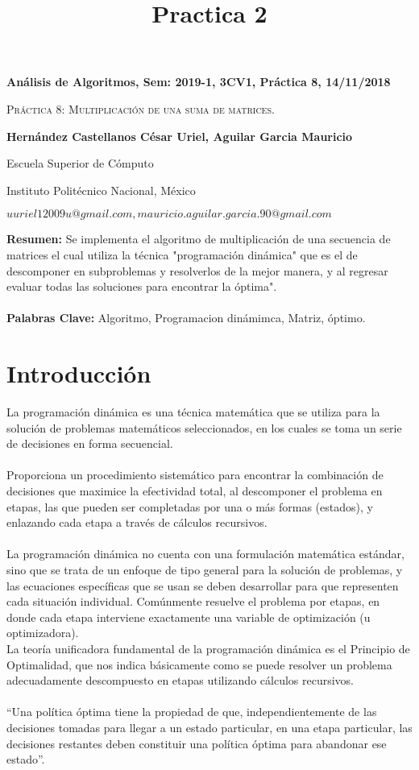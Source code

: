 \documentclass[12pt,twoside]{article}
\title{Practica 2}
\date{}
\begin{document}
\centerline{\bf An\'alisis de Algoritmos, Sem: 2019-1, 3CV1, Pr\'actica 8, 14/11/2018}
\centerline{}
\centerline{}
\begin{center}
\Large{\textsc{Pr\'actica 8:  Multiplicación de una suma de matrices.}}
\end{center}
\centerline{}
\centerline{\bf {Hern\'andez Castellanos C\'esar Uriel, Aguilar Garcia Mauricio}}
\centerline{}
\centerline{Escuela Superior de C\'omputo}
\centerline{Instituto Polit\'ecnico Nacional, M\'exico}
\centerline{$uuriel12009u@gmail.com, mauricio.aguilar.garcia.90@gmail.com$}
\newtheorem{Theorem}{\quad Theorem}[section]
\newtheorem{Definition}[Theorem]{\quad Definition}
\newtheorem{Corollary}[Theorem]{\quad Corollary}
\newtheorem{Lemma}[Theorem]{\quad Lemma}
\newtheorem{Example}[Theorem]{\quad Example}
\bigskip
\textbf{Resumen: } Se implementa el algoritmo de multiplicación de una secuencia de matrices el cual utiliza la técnica "programación dinámica" que es el de descomponer en subproblemas y resolverlos de la mejor manera, y al regresar evaluar todas las soluciones para encontrar la óptima".
\\ 
\\
\textbf{Palabras Clave: } Algoritmo, Programacion dinámimca, Matriz, óptimo.

\section{Introducción}
\label{sec:introduction}

La programación dinámica es una técnica matemática que se utiliza para la solución de problemas matemáticos seleccionados, en los cuales se toma un serie de decisiones en forma secuencial.\\\\
 Proporciona un procedimiento sistemático para encontrar la combinación de decisiones que maximice la efectividad total, al descomponer el problema en etapas, las que pueden ser completadas por una o más formas (estados), y enlazando cada etapa a través de cálculos recursivos.\\\\
  La programación dinámica no cuenta con una formulación matemática estándar, sino que se trata de un enfoque de tipo general para la solución de problemas, y las ecuaciones específicas que se usan se deben desarrollar para que representen cada situación individual. Comúnmente resuelve el problema por etapas, en donde cada etapa interviene exactamente una variable de optimización (u optimizadora).\\
 La teoría unificadora fundamental de la programación dinámica es el Principio de Optimalidad, que nos indica básicamente como se puede resolver un problema adecuadamente descompuesto en etapas utilizando cálculos recursivos.\\\\
 “Una política óptima tiene la propiedad de que, independientemente de las decisiones tomadas para llegar a un estado particular, en una etapa particular, las decisiones restantes deben constituir una política óptima para abandonar ese estado”. \cite{al1}\\
\end{document}
